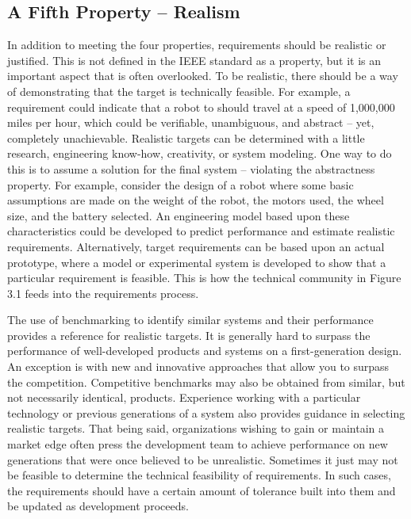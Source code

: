\subsection{A Fifth Property -- Realism}
\label{section:a-fifth-property-realism}

In addition to meeting the four properties, requirements should be
realistic or justified. This is not defined in the IEEE standard as a
property, but it is an important aspect that is often overlooked. To be
realistic, there should be a way of demonstrating that the target is
technically feasible. For example, a requirement could indicate that a
robot to should travel at a speed of 1,000,000 miles per hour, which
could be verifiable, unambiguous, and abstract -- yet, completely
unachievable. Realistic targets can be determined with a little
research, engineering know-how, creativity, or system modeling. One way
to do this is to assume a solution for the final system -- violating the
abstractness property. For example, consider the design of a robot where
some basic assumptions are made on the weight of the robot, the motors
used, the wheel size, and the battery selected. An engineering model
based upon these characteristics could be developed to predict
performance and estimate realistic requirements. Alternatively, target
requirements can be based upon an actual prototype, where a model or
experimental system is developed to show that a particular requirement
is feasible. This is how the technical community in Figure 3.1 feeds
into the requirements process.

The use of benchmarking to identify similar systems and their
performance provides a reference for realistic targets. It is generally
hard to surpass the performance of well-developed products and systems
on a first-generation design. An exception is with new and innovative
approaches that allow you to surpass the competition. Competitive
benchmarks may also be obtained from similar, but not necessarily
identical, products. Experience working with a particular technology or
previous generations of a system also provides guidance in selecting
realistic targets. That being said, organizations wishing to gain or
maintain a market edge often press the development team to achieve
performance on new generations that were once believed to be
unrealistic. Sometimes it just may not be feasible to determine the
technical feasibility of requirements. In such cases, the requirements
should have a certain amount of tolerance built into them and be updated
as development proceeds.

